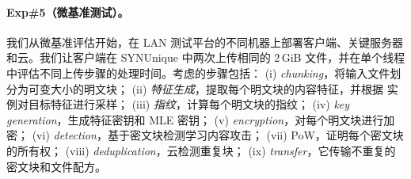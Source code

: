 \paragraph*{Exp\#5（微基准测试）。}
我们从微基准评估开始，在 LAN 测试平台的不同机器上部署客户端、关键服务器和云。我们让客户端在 SYNUnique 中两次上传相同的 2\,GiB 文件，并在单个线程中评估不同上传步骤的处理时间。考虑的步骤包括： (i) {\em chunking}，将输入文件划分为可变大小的明文块； (ii) {\em 特征生成}，提取每个明文块的内容特征，并根据 \sysnameF 实例对目标特征进行采样； (iii) {\em 指纹}，计算每个明文块的指纹； (iv) {\em key generation}，生成特征密钥和 MLE 密钥； (v) {\em encryption}，对每个明文块进行加密； (vi) {\em detection}，基于密文块检测学习内容攻击； (vii) {PoW}，证明每个密文块的所有权； (viii) {\em deduplication}，云检测重复块； (ix) {\em transfer}，它传输不重复的密文块和文件配方。



